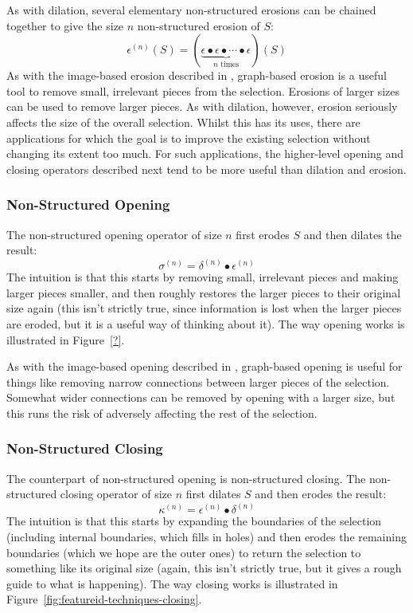 As with dilation, several elementary non-structured erosions can be chained together to give the size $n$ non-structured erosion of $S$:
%
\[
\epsilon^{(n)}(S) = (\underbrace{\epsilon \bullet \epsilon \bullet \cdots \bullet \epsilon}_{n \mbox{ times}})(S)
\]
%
As with the image-based erosion described in \cite{gonzalez02}, graph-based erosion is a useful tool to remove small, irrelevant pieces from the selection. Erosions of larger sizes can be used to remove larger pieces. As with dilation, however, erosion seriously affects the size of the overall selection. Whilst this has its uses, there are applications for which the goal is to improve the existing selection without changing its extent too much. For such applications, the higher-level opening and closing operators described next tend to be more useful than dilation and erosion.

\subsubsection{Non-Structured Opening}

The non-structured opening operator of size $n$ first erodes $S$ and then dilates the result:
%
\[
\sigma^{(n)} = \delta^{(n)} \bullet \epsilon^{(n)}
\]
%
The intuition is that this starts by removing small, irrelevant pieces and making larger pieces smaller, and then roughly restores the larger pieces to their original size again (this isn't strictly true, since information is lost when the larger pieces are eroded, but it is a useful way of thinking about it). The way opening works is illustrated in Figure~\ref{?}.

As with the image-based opening described in \cite{gonzalez02}, graph-based opening is useful for things like removing narrow connections between larger pieces of the selection. Somewhat wider connections can be removed by opening with a larger size, but this runs the risk of adversely affecting the rest of the selection.

\subsubsection{Non-Structured Closing}

The counterpart of non-structured opening is non-structured closing. The non-structured closing operator of size $n$ first dilates $S$ and then erodes the result:
%
\[
\kappa^{(n)} = \epsilon^{(n)} \bullet \delta^{(n)}
\]
%
The intuition is that this starts by expanding the boundaries of the selection (including internal boundaries, which fills in holes) and then erodes the remaining boundaries (which we hope are the outer ones) to return the selection to something like its original size (again, this isn't strictly true, but it gives a rough guide to what is happening). The way closing works is illustrated in Figure~\ref{fig:featureid-techniques-closing}.

